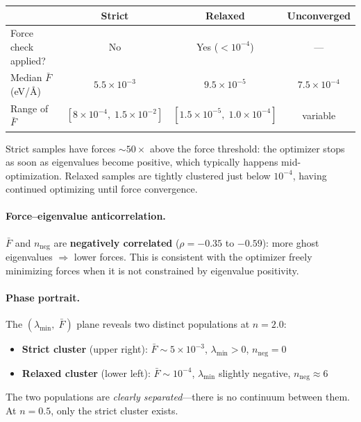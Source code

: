 \documentclass[11pt,a4paper]{article}
\theoremstyle{definition}
\begin{document}
\begin{center}\small
\begin{tabular}{lccc}
\toprule
& \textbf{Strict} & \textbf{Relaxed} & \textbf{Unconverged} \\
\midrule
Force check applied?      & No              & Yes ($<10^{-4}$) & --- \\
Median $\bar{F}$ (eV/\AA) & $5.5 \times 10^{-3}$ & $9.5 \times 10^{-5}$ & $7.5 \times 10^{-4}$ \\
Range of $\bar{F}$        & $[8 \times 10^{-4},\; 1.5 \times 10^{-2}]$
                          & $[1.5 \times 10^{-5},\; 1.0 \times 10^{-4}]$
                          & variable \\
\bottomrule
\end{tabular}
\end{center}

\noindent
Strict samples have forces ${\sim}50\times$ above the force threshold:
the optimizer stops as soon as eigenvalues become positive, which
typically happens mid-optimization.  Relaxed samples are tightly
clustered just below $10^{-4}$, having continued optimizing until force
convergence.

\paragraph{Force--eigenvalue anticorrelation.}
$\bar{F}$ and $n_\text{neg}$ are \textbf{negatively correlated}
($\rho = -0.35$ to $-0.59$): more ghost eigenvalues $\Rightarrow$ lower
forces.  This is consistent with the optimizer freely minimizing forces
when it is not constrained by eigenvalue positivity.

\paragraph{Phase portrait.}
The $(\lambda_\text{min},\;\bar{F})$ plane reveals two distinct
populations at $n{=}2.0$:
\begin{itemize}[nosep]
  \item \textbf{Strict cluster} (upper right): $\bar{F} \sim 5 \times 10^{-3}$,
    $\lambda_\text{min} > 0$, $n_\text{neg}{=}0$
  \item \textbf{Relaxed cluster} (lower left): $\bar{F} \sim 10^{-4}$,
    $\lambda_\text{min}$ slightly negative, $n_\text{neg} \approx 6$
\end{itemize}
The two populations are \emph{clearly separated}---there is no continuum
between them.  At $n{=}0.5$, only the strict cluster exists.
\end{document}
